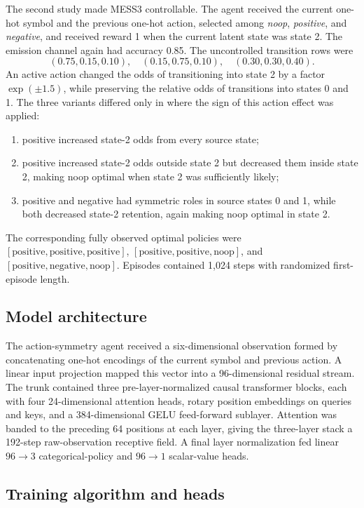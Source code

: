 \documentclass[11pt]{article}
\begin{document}
The second study made MESS3 controllable. The agent received the current
one-hot symbol and the previous one-hot action, selected among
\emph{noop}, \emph{positive}, and \emph{negative}, and received reward 1 when
the current latent state was state 2. The emission channel again had accuracy
0.85. The uncontrolled transition rows were
\[
  (0.75,0.15,0.10),\quad
  (0.15,0.75,0.10),\quad
  (0.30,0.30,0.40).
\]
An active action changed the odds of transitioning into state 2 by a factor
\(\exp(\pm1.5)\), while preserving the relative odds of transitions into
states 0 and 1. The three variants differed only in where the sign of this
action effect was applied:
\begin{enumerate}
  \item positive increased state-2 odds from every source state;
  \item positive increased state-2 odds outside state 2 but decreased them
    inside state 2, making noop optimal when state 2 was sufficiently likely;
  \item positive and negative had symmetric roles in source states 0 and 1,
    while both decreased state-2 retention, again making noop optimal in
    state 2.
\end{enumerate}
The corresponding fully observed optimal policies were
\([\text{positive},\text{positive},\text{positive}]\),
\([\text{positive},\text{positive},\text{noop}]\), and
\([\text{positive},\text{negative},\text{noop}]\). Episodes contained 1,024
steps with randomized first-episode length.

\subsection{Model architecture}

The action-symmetry agent received a six-dimensional observation formed by
concatenating one-hot encodings of the current symbol and previous action. A
linear input projection mapped this vector into a 96-dimensional residual
stream. The trunk contained three pre-layer-normalized causal transformer
blocks, each with four 24-dimensional attention heads, rotary position
embeddings on queries and keys, and a 384-dimensional GELU feed-forward
sublayer. Attention was banded to the preceding 64 positions at each layer,
giving the three-layer stack a 192-step raw-observation receptive field. A
final layer normalization fed linear \(96\!\rightarrow\!3\) categorical-policy
and \(96\!\rightarrow\!1\) scalar-value heads.

\subsection{Training algorithm and heads}
\end{document}
